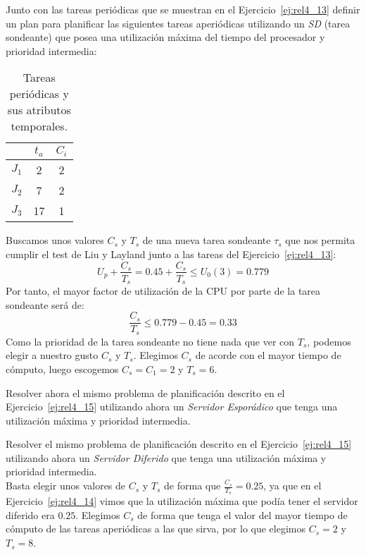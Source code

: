 \begin{ejercicio}\label{ej:rel4_15}
    Junto con las tareas periódicas que se muestran en el Ejercicio~\ref{ej:rel4_13} definir un plan para planificar las siguientes tareas aperiódicas utilizando un \textit{SD} (tarea sondeante) que posea una utilización máxima del tiempo del procesador y prioridad intermedia:
    \begin{table}[H]
    \centering
    \begin{tabular}{|c|c|c|}
        \hline
        & $t_a$ & $C_i$ \\
        \hline
        $J_1$ & 2 & 2 \\
        \hline
        $J_2$ & 7 & 2 \\
        \hline
        $J_3$ & 17 & 1 \\
        \hline
    \end{tabular}
    \caption{Tareas periódicas y sus atributos temporales.}
    \label{tab:4_15}
    \end{table}

    Buscamos unos valores $C_s$ y $T_s$ de una nueva tarea sondeante $\tau_s$ que nos permita cumplir el test de Liu y Layland junto a las tareas del Ejercicio~\ref{ej:rel4_13}:
    \begin{equation*}
        U_p + \dfrac{C_s}{T_s} = 0.45 + \dfrac{C_s}{T_s} \leq U_0(3) = 0.779
    \end{equation*}
    Por tanto, el mayor factor de utilización de la CPU por parte de la tarea sondeante será de:
    \begin{equation*}
        \dfrac{C_s}{T_s} \leq 0.779 - 0.45 = 0.33
    \end{equation*}
    Como la prioridad de la tarea sondeante no tiene nada que ver con $T_s$, podemos elegir a nuestro gusto $C_s$ y $T_s$. Elegimos $C_s$ de acorde con el mayor tiempo de cómputo, luego escogemos $C_s = C_1 = 2$ y $T_s = 6$.
\end{ejercicio}

\begin{ejercicio}\label{ej:rel4_16}
    Resolver ahora el mismo problema de planificación descrito en el Ejercicio~\ref{ej:rel4_15} utilizando ahora un \textit{Servidor Esporádico} que tenga una utilización máxima y prioridad intermedia.
\end{ejercicio}

\begin{ejercicio}\label{ej:rel4_17}
    Resolver el mismo problema de planificación descrito en el Ejercicio~\ref{ej:rel4_15} utilizando ahora un \textit{Servidor Diferido} que tenga una utilización máxima y prioridad intermedia.\\

    Basta elegir unos valores de $C_s$ y $T_s$ de forma que $\frac{C_s}{T_s} = 0.25$, ya que en el Ejercicio~\ref{ej:rel4_14} vimos que la utilización máxima que podía tener el servidor diferido era $0.25$. Elegimos $C_s$ de forma que tenga el valor del mayor tiempo de cómputo de las tareas aperiódicas a las que sirva, por lo que elegimos $C_s=2$ y $T_s = 8$.
\end{ejercicio}

